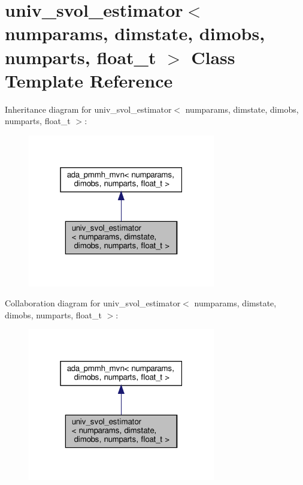 \hypertarget{classuniv__svol__estimator}{}\section{univ\+\_\+svol\+\_\+estimator$<$ numparams, dimstate, dimobs, numparts, float\+\_\+t $>$ Class Template Reference}
\label{classuniv__svol__estimator}


Inheritance diagram for univ\+\_\+svol\+\_\+estimator$<$ numparams, dimstate, dimobs, numparts, float\+\_\+t $>$\+:
\nopagebreak
\begin{figure}[H]
\begin{center}
\leavevmode
\includegraphics[width=232pt]{classuniv__svol__estimator__inherit__graph}
\end{center}
\end{figure}


Collaboration diagram for univ\+\_\+svol\+\_\+estimator$<$ numparams, dimstate, dimobs, numparts, float\+\_\+t $>$\+:
\nopagebreak
\begin{figure}[H]
\begin{center}
\leavevmode
\includegraphics[width=232pt]{classuniv__svol__estimator__coll__graph}
\end{center}
\end{figure}
